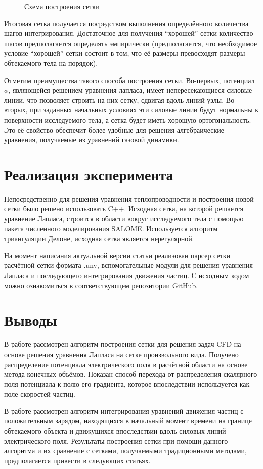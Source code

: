 \documentclass[a4paper,12pt]{article}
\begin{document}
\begin{figure}[htbp]
    \centering
    
    \caption{Схема построения сетки}
    \label{fig:схема построения сетки}
\end{figure}

Итоговая сетка получается посредством выполнения определённого количества шагов интегрирования. Достаточное для получения “хорошей” сетки количество шагов предполагается определять эмпирически (предполагается, что необходимое условие “хорошей” сетки состоит в том, что её размеры превосходят размеры обтекаемого тела на порядок).

Отметим преимущества такого способа построения сетки. Во-первых, потенциал $\phi$, являющейся решением уравнения лапласа, имеет непересекающиеся силовые линии, что позволяет строить на них сетку, сдвигая вдоль линий узлы. Во-вторых, при заданных начальных условиях эти силовые линии будут нормальны к поверхности исследуемого тела, а сетка будет иметь хорошую ортогональность. Это её свойство обеспечит более удобные для решения алгебраические уравнения, получаемые из уравнений газовой динамики.

\section{Реализация эксперимента}

Непосредственно для решения уравнения теплопроводности и построения новой сетки было решено использовать C++. Исходная сетка, на которой решается уравнение Лапласа, строится в области вокруг исследуемого тела с помощью пакета численного моделирования SALOME. Используется алгоритм триангуляции Делоне, исходная сетка является нерегулярной.

На момент написания актуальной версии статьи реализован парсер сетки расчётной сетки формата .unv, вспомогательные модули для решения уравнения Лапласа и последующего интегрирования движения частиц. С исходным кодом можно ознакомиться в \href{https://github.com/d-qql/FlowMeshBuilder}{соответствующем репозитории  GitHub}.

\section{Выводы}

В работе рассмотрен алгоритм построения сетки для решения задач CFD на основе  решения уравнения Лапласа на сетке произвольного вида. Получено распределение потенциала электрического поля в расчётной области на основе метода конечных объёмов. Показан способ перехода от распределения скалярного поля потенциала к полю его градиента, которое впоследствии используется как поле скоростей частиц.

В работе рассмотрен алгоритм интегрирования уравнений движения частиц с положительным зарядом, находящихся в начальный момент времени на границе обтекаемого объекта и движущихся впоследствии вдоль силовых линий электрического поля. Результаты построения сетки при помощи данного алгоритма и их сравнение с сетками, получаемыми традиционными методами, предполагается привести в следующих статьях.

\nocite{кудрявцев2010краткий}
\nocite{ландау2001теоретическая}

\printbibliography
\end{document}

